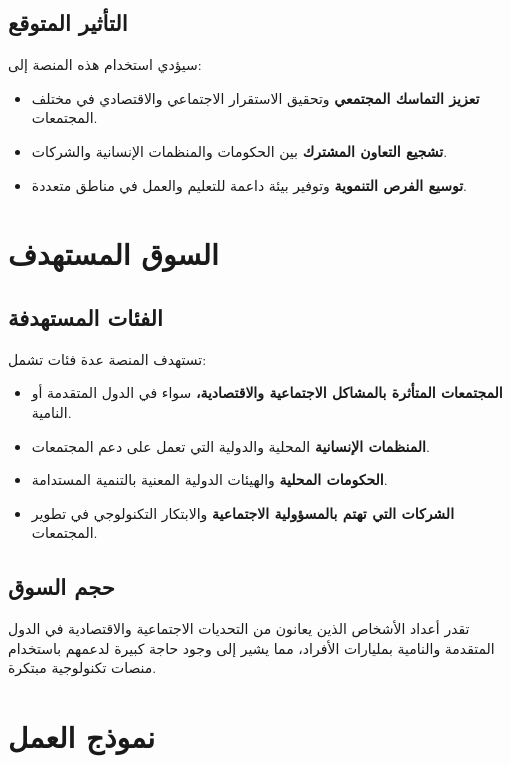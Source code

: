 \documentclass[12pt]{article}
\begin{document}
\subsection*{\textcolor{sectionColor}{التأثير المتوقع}}
سيؤدي استخدام هذه المنصة إلى:
\begin{itemize}
    \item \textbf{تعزيز التماسك المجتمعي} وتحقيق الاستقرار الاجتماعي والاقتصادي في مختلف المجتمعات.
    \item \textbf{تشجيع التعاون المشترك} بين الحكومات والمنظمات الإنسانية والشركات.
    \item \textbf{توسيع الفرص التنموية} وتوفير بيئة داعمة للتعليم والعمل في مناطق متعددة.
\end{itemize}

\section {\textcolor{sectionColor}{السوق المستهدف}}
\subsection*{\textcolor{sectionColor}{الفئات المستهدفة}}
تستهدف المنصة عدة فئات تشمل:
\begin{itemize}
    \item \textbf{المجتمعات المتأثرة بالمشاكل الاجتماعية والاقتصادية،} سواء في الدول المتقدمة أو النامية.
    \item \textbf{المنظمات الإنسانية} المحلية والدولية التي تعمل على دعم المجتمعات.
    \item \textbf{الحكومات المحلية} والهيئات الدولية المعنية بالتنمية المستدامة.
    \item \textbf{الشركات التي تهتم بالمسؤولية الاجتماعية} والابتكار التكنولوجي في تطوير المجتمعات.
\end{itemize}

\subsection*{\textcolor{sectionColor}{حجم السوق}}
تقدر أعداد الأشخاص الذين يعانون من التحديات الاجتماعية والاقتصادية في الدول المتقدمة والنامية بمليارات الأفراد، مما يشير إلى وجود حاجة كبيرة لدعمهم باستخدام منصات تكنولوجية مبتكرة.

\section {\textcolor{sectionColor}{نموذج العمل}}
\end{document}
